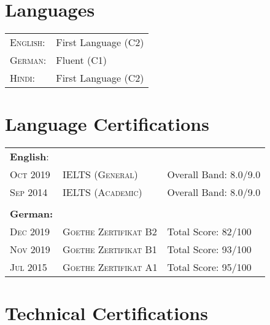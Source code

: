 \documentclass[a4paper,10pt]{article} %
\begin{document}
\section{Languages}

\begin{tabular}{ll}
\textsc{English:} & First Language (C2)\\

\textsc{German:} & Fluent (C1)\\

\textsc{Hindi:} & First Language (C2)\\
\end{tabular}


\section{Language Certifications}

\begin{tabular}{lll}
\textbf{English}: & &\\
\textsc{Oct 2019} & \textsc{IELTS (General)} & Overall Band: 8.0/9.0\\
\textsc{Sep 2014} & \textsc{IELTS (Academic)} & Overall Band: 8.0/9.0\\
\\
\textbf{German:} & \\
\textsc{Dec 2019} & \textsc{Goethe Zertifikat B2} & Total Score: 82/100\\
\textsc{Nov 2019} & \textsc{Goethe Zertifikat B1} & Total Score: 93/100\\
\textsc{Jul 2015} & \textsc{Goethe Zertifikat A1} & Total Score: 95/100\\

\end{tabular}


\section{Technical Certifications}
\end{document}

